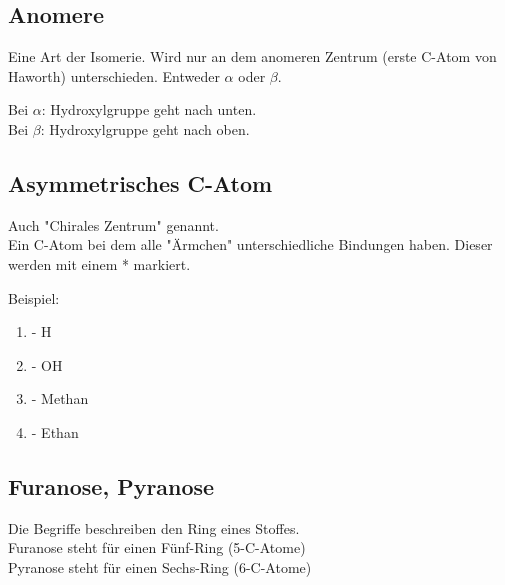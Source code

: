 \subsection{Anomere}
Eine Art der Isomerie. 
Wird nur an dem anomeren Zentrum (erste C-Atom von Haworth) unterschieden.
Entweder $\alpha$ oder $\beta$. 

Bei $\alpha$: Hydroxylgruppe geht nach unten.\\
Bei $\beta$: Hydroxylgruppe geht nach oben.


\subsection{Asymmetrisches C-Atom}
Auch "Chirales Zentrum" genannt. \\
Ein C-Atom bei dem alle "Ärmchen" unterschiedliche Bindungen haben. Dieser werden mit einem * markiert.

Beispiel:
\begin{enumerate}
    \item - H
    \item - OH
    \item - Methan
    \item - Ethan
\end{enumerate}

\subsection{Furanose, Pyranose}
Die Begriffe beschreiben den Ring eines Stoffes. \\
Furanose steht für einen Fünf-Ring (5-C-Atome) \\
Pyranose steht für einen Sechs-Ring (6-C-Atome)
